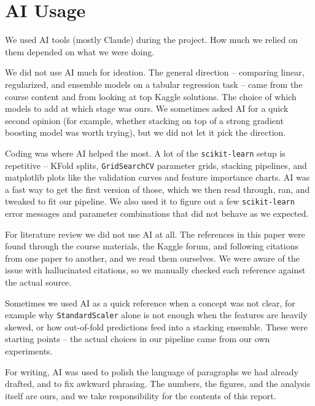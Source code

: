 \documentclass{article}
\begin{document}
\section{AI Usage}

We used AI tools (mostly Claude) during the project. How much we
relied on them depended on what we were doing.

We did not use AI much for ideation. The general direction --
comparing linear, regularized, and ensemble models on a tabular
regression task -- came from the course content and from looking
at top Kaggle solutions. The choice of which models to add at
which stage was ours. We sometimes asked AI for a quick second
opinion (for example, whether stacking on top of a strong gradient
boosting model was worth trying), but we did not let it pick the
direction.

Coding was where AI helped the most. A lot of the
\texttt{scikit-learn} setup is repetitive -- KFold splits,
\texttt{GridSearchCV} parameter grids, stacking pipelines, and
matplotlib plots like the validation curves and feature importance
charts. AI was a fast way to get the first version of those, which
we then read through, ran, and tweaked to fit our pipeline. We
also used it to figure out a few \texttt{scikit-learn} error
messages and parameter combinations that did not behave as we
expected.

For literature review we did not use AI at all. The references in
this paper were found through the course materials, the Kaggle
forum, and following citations from one paper to another, and we
read them ourselves. We were aware of the issue with hallucinated
citations, so we manually checked each reference against the
actual source.

Sometimes we used AI as a quick reference when a concept was not
clear, for example why \texttt{StandardScaler} alone is not enough
when the features are heavily skewed, or how out-of-fold
predictions feed into a stacking ensemble. These were starting
points -- the actual choices in our pipeline came from our own
experiments.

For writing, AI was used to polish the language of paragraphs we
had already drafted, and to fix awkward phrasing. The numbers, the
figures, and the analysis itself are ours, and we take
responsibility for the contents of this report.
\end{document}
